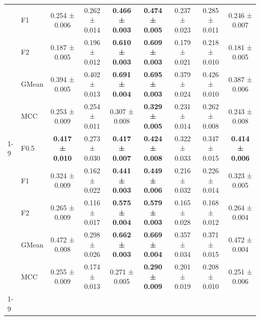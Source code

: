\begin{table}[H]
{\begin{tabular}{llccccccc}
 & F1 & 0.254 ± 0.006 & 0.262 ± 0.014 & \textbf{0.466 ± 0.003} & \textbf{0.474 ± 0.005} & 0.237 ± 0.023 & 0.285 ± 0.011 & 0.246 ± 0.007 \\
 & F2 & 0.187 ± 0.005 & 0.196 ± 0.012 & \textbf{0.610 ± 0.003} & \textbf{0.609 ± 0.003} & 0.179 ± 0.021 & 0.218 ± 0.010 & 0.181 ± 0.005 \\
 & GMean & 0.394 ± 0.005 & 0.402 ± 0.013 & \textbf{0.691 ± 0.004} & \textbf{0.695 ± 0.003} & 0.379 ± 0.024 & 0.426 ± 0.010 & 0.387 ± 0.006 \\
 & MCC & 0.253 ± 0.009 & 0.254 ± 0.011 & 0.307 ± 0.008 & \textbf{0.329 ± 0.005} & 0.231 ± 0.014 & 0.262 ± 0.008 & 0.243 ± 0.008 \\
\cline{1-9}
\multirow[t]{5}{*}{XGBoost} & F0.5 & \textbf{0.417 ± 0.010} & 0.273 ± 0.030 & \textbf{0.417 ± 0.007} & \textbf{0.424 ± 0.008} & 0.322 ± 0.033 & 0.347 ± 0.015 & \textbf{0.414 ± 0.006} \\
 & F1 & 0.324 ± 0.009 & 0.162 ± 0.022 & \textbf{0.441 ± 0.003} & \textbf{0.449 ± 0.006} & 0.216 ± 0.032 & 0.226 ± 0.014 & 0.323 ± 0.005 \\
 & F2 & 0.265 ± 0.009 & 0.116 ± 0.017 & \textbf{0.575 ± 0.004} & \textbf{0.579 ± 0.003} & 0.165 ± 0.028 & 0.168 ± 0.012 & 0.264 ± 0.004 \\
 & GMean & 0.472 ± 0.008 & 0.298 ± 0.026 & \textbf{0.662 ± 0.003} & \textbf{0.669 ± 0.004} & 0.357 ± 0.034 & 0.371 ± 0.015 & 0.472 ± 0.004 \\
 & MCC & 0.255 ± 0.009 & 0.174 ± 0.013 & 0.271 ± 0.005 & \textbf{0.290 ± 0.009} & 0.201 ± 0.019 & 0.208 ± 0.010 & 0.251 ± 0.006 \\
\cline{1-9}
\bottomrule
\end{tabular}
    }
\end{table}
